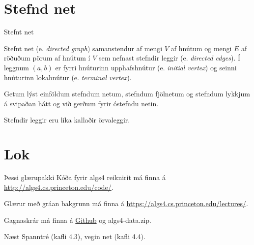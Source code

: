 \documentclass{beamer}
\begin{document}








\section{Stefnd net}

\begin{frame}{Stefnt net}
	\begin{tcolorbox}[title=Stefnt net]
		Stefnt net (e. \emph{directed graph}) samanstendur af mengi $V$ af hnútum og mengi $E$ af röðuðum pörum af hnútum í $V$ sem nefnast stefndir leggir (e. \emph{directed edges}). Í leggnum $(a, b)$ er fyrri hnúturinn upphafshnútur (e. \emph{initial vertex}) og seinni hnúturinn lokahnútur (e. \emph{terminal vertex}).
	\end{tcolorbox}

	Getum lýst einföldum stefndum netum, stefndum fjölnetum og stefndum lykkjum á svipaðan hátt og við gerðum fyrir óstefndu netin.

	Stefndir leggir eru líka kallaðir örvaleggir.
\end{frame}







\section{Lok}

\begin{frame}{Þessi glærupakki}
	Kóða fyrir algs4 reiknirit má finna á \url{http://algs4.cs.princeton.edu/code/}.

	Glærur með gráan bakgrunn má finna á \url{https://algs4.cs.princeton.edu/lectures/}.

	Gagnaskrár má finna á \href{https://github.com/Ernir/kennsluefni/tree/master/T2/Code/w11}{Github} og algs4-data.zip.
\end{frame}

\begin{frame}{Næst}
	Spanntré (kafli 4.3), vegin net (kafli 4.4).
\end{frame}
\end{document}
